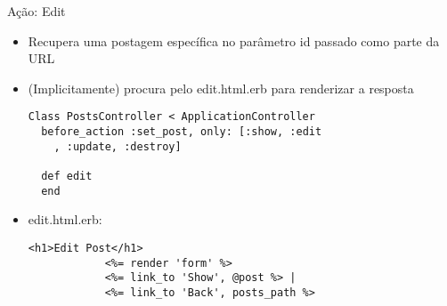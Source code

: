 \begin{frame}{Ação: Edit}
	\begin{itemize}
		\item Recupera uma postagem específica no parâmetro \alert{id} passado como parte da URL
		\item (Implicitamente) procura pelo \alert{edit.html.erb} para renderizar a resposta
		\begin{lstlisting}[style=RubyInputStyle, caption=controllers/posts\_controller.rb]
Class PostsController < ApplicationController
  before_action :set_post, only: [:show, :edit
  	, :update, :destroy]

  def edit 
  end 
		\end{lstlisting}		
		
		\item \alert{edit.html.erb}:
		\begin{lstlisting}[style=RubyInputStyle, caption=view/posts/edit.html.erb]
			<h1>Edit Post</h1>
			<%= render 'form' %>
			<%= link_to 'Show', @post %> |
			<%= link_to 'Back', posts_path %> 
		\end{lstlisting}		
	\end{itemize}	
\end{frame}